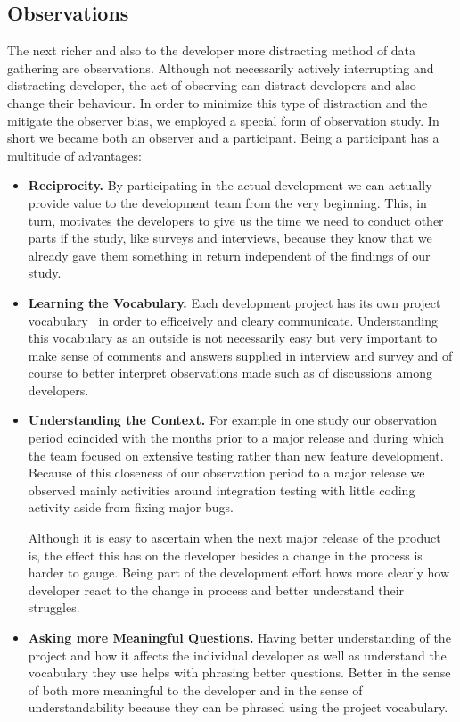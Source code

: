 \subsection{Observations}
The next richer and also to the developer more distracting method of data gathering are observations.
Although not necessarily actively interrupting and distracting developer, the act of observing can distract developers and also change their behaviour.
In order to minimize this type of distraction and the mitigate the observer bias, we employed a special form of observation study.
In short we became both an observer and a participant.
%
Being a participant has a multitude of advantages:

\begin{itemize}
\item\textbf{Reciprocity.} By participating in the actual development we can actually provide value to the development team from the very beginning.
This, in turn, motivates the developers to give us the time we need to conduct other parts if the study, like surveys and interviews, because they know that we already gave them something in return independent of the findings of our study.
\item\textbf{Learning the Vocabulary.} Each development project has its own project vocabulary~\cite{espinosa2007:team_knowledge} in order to efficeively and cleary communicate. 
Understanding this vocabulary as an outside is not necessarily easy but very important to make sense of comments and answers supplied in interview and survey and of course to better interpret observations made such as of discussions among developers.
\item\textbf{Understanding the Context.} For example in one study our observation period coincided with the months prior to a major release and during which the team focused on extensive testing rather than new feature development. 
Because of this closeness of our observation period to a major release we observed mainly activities around integration testing with little coding activity aside from fixing major bugs.

Although it is easy to ascertain when the next major release of the product is, the effect this has on the developer besides a change in the process is harder to gauge.
Being part of the development effort hows more clearly how developer react to the change in process and better understand their struggles.

\item\textbf{Asking more Meaningful Questions.} Having better understanding of the project and how it affects the individual developer as well as understand the vocabulary they use helps with phrasing better questions.
Better in the sense of both more meaningful to the developer and in the sense of understandability because they can be phrased using the project vocabulary.
\end{itemize}

